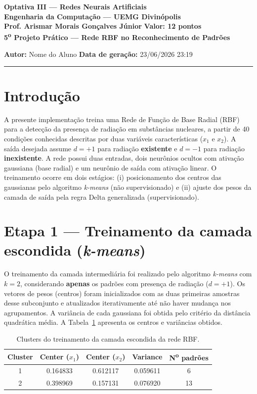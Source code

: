 \documentclass[12pt,a4paper]{article}
\begin{document}
\begin{center}
  {\large \textbf{Optativa III --- Redes Neurais Artificiais}}\\[3pt]
  \textbf{Engenharia da Computação --- UEMG Divinópolis}\\[3pt]
  \textbf{Prof. Arismar Morais Gonçalves Júnior} \hfill \textbf{Valor: 12 pontos}\\[10pt]
  {\Large \textbf{5\textsuperscript{o} Projeto Prático --- Rede RBF no Reconhecimento de Padrões}}\\[10pt]
\end{center}
\noindent\textbf{Autor:} Nome do Aluno \hfill \textbf{Data de geração:} 23/06/2026 23:19\\[4pt]
\noindent\rule{\textwidth}{0.4pt}

\section*{Introdução}
A presente implementação treina uma Rede de Função de Base Radial (RBF) para a
detecção da presença de radiação em substâncias nucleares, a partir de 40 condições
conhecidas descritas por duas variáveis características ($x_1$ e $x_2$). A saída
desejada assume $d = +1$ para radiação \textbf{existente} e $d = -1$ para radiação
\textbf{inexistente}. A rede possui duas entradas, dois neurônios ocultos com ativação
gaussiana (base radial) e um neurônio de saída com ativação linear. O treinamento
ocorre em dois estágios: (i) posicionamento dos centros das gaussianas pelo algoritmo
\textit{k-means} (não supervisionado) e (ii) ajuste dos pesos da camada de saída pela
regra Delta generalizada (supervisionado).

\section*{Etapa 1 --- Treinamento da camada escondida (\textit{k-means})}
O treinamento da camada intermediária foi realizado pelo algoritmo \textit{k-means}
com $k = 2$, considerando \textbf{apenas} os padrões com presença de radiação
($d = +1$). Os vetores de pesos (centros) foram inicializados com as duas primeiras
amostras desse subconjunto e atualizados iterativamente até não haver mudança nos
agrupamentos. A variância de cada gaussiana foi obtida pelo critério da distância
quadrática média. A Tabela~\ref{tab:clusters} apresenta os centros e variâncias obtidos.

\begin{table}[H]
\centering
\caption{Clusters do treinamento da camada escondida da rede RBF.}
\label{tab:clusters}
\begin{tabular}{ccccc}
\toprule
\textbf{Cluster} & \textbf{Center ($x_1$)} & \textbf{Center ($x_2$)} & \textbf{Variance} & \textbf{N\textsuperscript{o} padrões} \\
\midrule
1 & 0.164833 & 0.612117 & 0.059611 & 6 \\
2 & 0.398969 & 0.157131 & 0.076920 & 13 \\
\bottomrule
\end{tabular}
\end{table}
\end{document}
